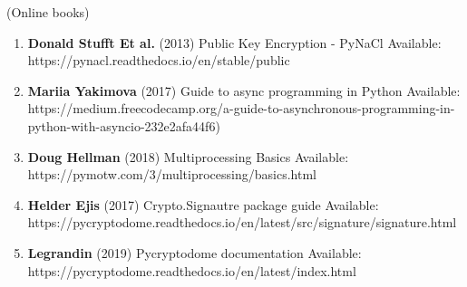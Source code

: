 \scriptsize{(Online books)}
\begin{enumerate}
    \item \textbf{Donald Stufft Et al.} (2013) Public Key Encryption - PyNaCl
        Available: https://pynacl.readthedocs.io/en/stable/public

    \item \textbf{Mariia Yakimova} (2017) Guide to async programming in Python
        Available: https://medium.freecodecamp.org/a-guide-to-asynchronous-programming-in-python-with-asyncio-232e2afa44f6)

    \item \textbf{Doug Hellman} (2018) Multiprocessing Basics
        Available: https://pymotw.com/3/multiprocessing/basics.html

    \item \textbf{Helder Ejis} (2017) Crypto.Signautre package guide
        Available: https://pycryptodome.readthedocs.io/en/latest/src/signature/signature.html

    \item \textbf{Legrandin} (2019) Pycryptodome documentation
        Available: https://pycryptodome.readthedocs.io/en/latest/index.html
\end{enumerate}

\newpage
